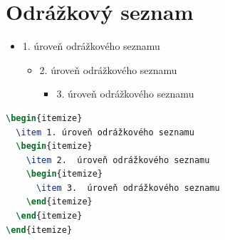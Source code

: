 %

\section{Odrážkový seznam}

\begin{itemize}
  \item 1. úroveň odrážkového seznamu
  \begin{itemize}
    \item 2.  úroveň odrážkového seznamu
    \begin{itemize}
      \item 3.  úroveň odrážkového seznamu
    \end{itemize}
  \end{itemize}
\end{itemize}

\begin{lstlisting}[caption={Příklad vložení odrážkového seznamu},label=list:8-6,captionpos=t,abovecaptionskip=-\medskipamount,belowcaptionskip=\medskipamount,language=TeX]
\begin{itemize}
  \item 1. úroveň odrážkového seznamu
  \begin{itemize}
    \item 2.  úroveň odrážkového seznamu
    \begin{itemize}
      \item 3.  úroveň odrážkového seznamu
    \end{itemize}
  \end{itemize}
\end{itemize}
\end{lstlisting}

